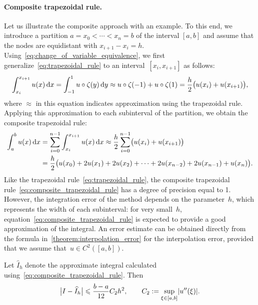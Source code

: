 \paragraph{Composite trapezoidal rule.}
Let us illustrate the composite approach with an example.
To this end,
we introduce a partition $a = x_0 < \dotsb < x_n = b$ of the interval $[a, b]$ and
assume that the nodes are equidistant with $x_{i+1} - x_i = h$.
Using~\eqref{eq:change_of_variable_equivalence},
we first generalize~\eqref{eq:trapezoidal_rule} to an interval~$[x_i, x_{i+1}]$ as follows:
\[
    \int_{x_i}^{x_{i+1}} u(x) \, \mathrm d x
    = \int_{-1}^{1} u \circ \zeta (y) \, \mathrm d y
    \approx u \circ \zeta(-1)  + u \circ \zeta(1)
    = \frac{h}{2} \bigl(u(x_i) + u(x_{i+1})\bigr),
\]
where $\approx$ in this equation indicates approximation using the trapezoidal rule.
Applying this approximation to each subinterval of the partition,
we obtain the composite trapezoidal rule:
\begin{align}
    \notag
    \int_{a}^{b} u(x) \, \mathrm d x
    &= \sum_{i=0}^{n-1} \int_{x_i}^{x_{i+1}} u(x) \, \mathrm d x
    \approx
    \frac{h}{2}\sum_{i=0}^{n-1} \bigl( u(x_i) + u(x_{i+1}) \bigr) \\
    \label{eq:composite_trapezoidal_rule}
    &= \frac{h}{2} \bigl( u(x_0) + 2 u(x_1) + 2 u(x_2) + \dotsb + 2 u(x_{n-2}) + 2 u(x_{n-1}) + u(x_n) \bigr).
\end{align}
Like the trapezoidal rule~\eqref{eq:trapezoidal_rule},
the composite trapezoidal rule~\eqref{eq:composite_trapezoidal_rule} has a degree of precision equal to 1.
However,
the integration error of the method depends on the parameter~$h$,
which represents the width of each subinterval:
for very small~$h$,
equation~\eqref{eq:composite_trapezoidal_rule} is expected to provide a good approximation of the integral.
An error estimate can be obtained directly from the formula in~\cref{theorem:interpolation_error} for the interpolation error,
provided that we assume that~$u \in C^2([a, b])$.

\begin{theorem}
    \label{theorem:integration_error_trapeze}
    Let $\widehat I_h$ denote the approximate integral calculated using~\eqref{eq:composite_trapezoidal_rule}.
    Then
    \begin{equation}
        \label{eq:error_bound_trapezoidal}
        \bigl\lvert I - \widehat I_h \bigr\rvert
        \leq \frac{b-a}{12} C_2 h^2,
        \qquad
        C_2 := \sup_{\xi \in [a, b]} \abs*{u''(\xi)}.
    \end{equation}
\end{theorem}

